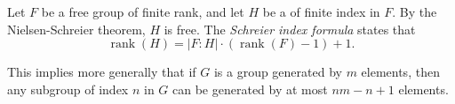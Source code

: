 \documentclass[12pt]{article}
\def\rank{\operatorname{rank}}
\begin{document}

Let $F$ be a free group of finite rank, and let $H$ be a  of finite index in $F$.
By the Nielsen-Schreier theorem, $H$ is free.
The \emph{Schreier index formula} states that
\[\rank(H)=|F:H|\cdot(\rank(F)-1)+1.\]

This implies more generally that if $G$ is a group generated by $m$ elements, then any subgroup of index $n$ in $G$ can be generated by at most $nm-n+1$ elements.
\end{document}
